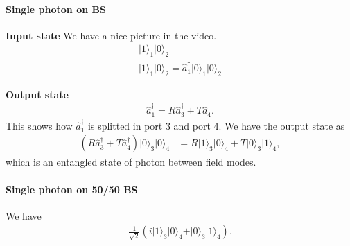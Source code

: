 \documentclass[../../note.tex]{subfiles}
\begin{document}
\paragraph{Single photon on BS}
\textbf{Input state}
We have a nice picture in the video.
\begin{align}
    \vert 1 \rangle_1 \vert 0 \rangle_2 \\
    \vert 1 \rangle_1 \vert 0 \rangle_2 = \hat{a}_1^\dagger \vert 0 \rangle_1 \vert 0 \rangle_2
\end{align}

\textbf{Output state}
\begin{align}
    \hat{a}_1^\dagger = R \hat{a}_3^\dagger + T \hat{a}_4^\dagger.
\end{align}
This shows how $\hat{a}_1^\dagger$ is splitted in port 3 and port 4. We have the output state as
\begin{align}
    \left(R \hat{a}_3^\dagger + T\hat{a}_4^\dagger \right) \vert 0 \rangle_3 \vert 0 \rangle_4
    &= R \vert 1 \rangle_3 \vert 0 \rangle_4 + T \vert 0 \rangle_3 \vert 1 \rangle_4,
\end{align}
which is an entangled state of photon between field modes.

\paragraph{Single photon on 50/50 BS}
We have
\begin{align}
     \frac{1}{\sqrt{2}} (i \vert 1 \rangle_3 \vert 0 \rangle_4 + \vert 0 \rangle_3 \vert 1 \rangle_4).
\end{align}
\end{document}
